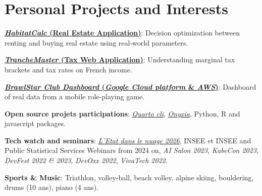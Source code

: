 \documentclass[a4paper,10.5pt]{article}
\newlength{\spaceItemEnd}\setlength{\spaceItemEnd}{-0.8pt}
\newlength{\spaceSubItem}\setlength{\spaceSubItem}{-1pt}
\newlength{\spaceProjSec}\setlength{\spaceProjSec}{0.5mm}
\newcommand{\resumeItem}[2]{
  \item\small{
    \textbf{#1}{: #2\vspace{\spaceItemEnd}}
  }
}
\newcommand{\resumeSubItem}[2]{
    \small{\resumeItem{#1}{#2}\vspace{\spaceSubItem}}
}
\newcommand{\resumeSubHeadingListStart}{\begin{itemize}[leftmargin=*, label=\textperiodcentered]} %
\newcommand{\resumeSubHeadingListEnd}{\end{itemize}}
\begin{document}
\section{Personal Projects and Interests}
\vspace{\spaceProjSec}
\begin{minipage}[t]{0.9865\textwidth}
\resumeSubHeadingListStart
    \resumeSubItem{\href{https://odysseu.github.io/HabitatCalc/}{\textit{HabitatCalc} (Real Estate Application)}}{Decision optimization between renting and buying real estate using real-world parameters.}
    \resumeSubItem{\href{https://odysseu.github.io/TrancheMaster/}{\textit{TrancheMaster} (Tax Web Application)}}{Understanding marginal tax brackets and tax rates on French income.}
    \resumeSubItem{\href{https://github.com/odysseu/Brawlstar-Club-Dashboard.github.io}{\textit{BrawlStar Club Dashboard} (\textit{Google Cloud platform} \& \textit{AWS})}}{Dashboard of real data from a mobile role-playing game.}
    \resumeSubItem{Open source projets participations}{\href{https://github.com/quarto-dev/quarto-cli}{\textit{Quarto cli}}, \href{https://github.com/InseeFrLab/onyxia}{\textit{Onyxia}}, Python, R and javascript packages.}
    \resumeSubItem{Tech watch and seminars}{\href{https://www.numerique.gouv.fr/agenda/etat-dans-le-nuage-2026/}{\textit{L'Etat dans le nuage 2026}}, INSEE et INSEE and Public Statistical Services Webinars from 2024 on, \textit{AI Salon 2023}, \textit{KubeCon 2023}, \textit{DevFest 2022 \& 2023}, \textit{DevOxx 2022}, \textit{VivaTech 2022}.}
    \resumeSubItem{Sports \& Music}{Triathlon, volley-ball, beach volley, alpine skiing, bouldering, drums (10 ans), piano (4 ans).}
\resumeSubHeadingListEnd
\end{minipage}

\end{document}
